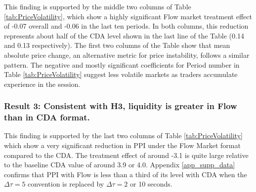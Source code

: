 \documentclass[12pt]{article}
\begin{document}
This finding is supported by the middle two columns of Table \ref{tab:PriceVolatility}, which show a highly significant Flow market treatment effect
of -0.07 overall and -0.06 in the last ten periods. In both columns, this reduction represents about half of the CDA level shown in the last line of the Table (0.14 and 0.13 respectively). The first two columns of the Table show that mean absolute price change, an alternative metric for price instability, follows a similar pattern.  
The negative and mostly significant coefficients for Period number in Table \ref{tab:PriceVolatility} suggest less volatile markets as traders accumulate experience in the session.

\subsubsection*{Result 3: Consistent with H3, liquidity is greater in Flow than in  CDA format.}

This finding is supported by the last two columns of Table \ref{tab:PriceVolatility} which show a very significant reduction in PPI under the Flow Market format compared to the CDA. The treatment effect of around -3.1 is quite large relative to the baseline CDA value of around 3.9 or 4.0. 
Appendix \ref{app_supp_data} confirms that PPI with Flow is less than a third of its level with CDA when the $\Delta \tau = 5$ convention is replaced by $\Delta \tau = 2$ or 10 seconds.
\end{document}
